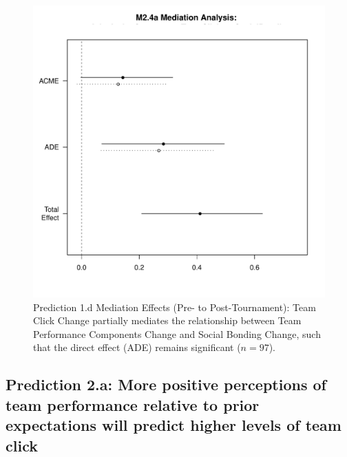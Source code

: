 \begin{CJK}{UTF8}{gbsn}
  \begin{figure}[htbp]
    \centering
    \includegraphics[scale=.5]{images/MLM24aMediationAnalysisOffline1.pdf}
    \caption{Prediction 1.d Mediation Effects (Pre- to Post-Tournament): Team Click Change partially mediates the relationship between Team Performance Components Change and Social Bonding Change, such that the direct effect (ADE) remains significant ($n = 97$).}
    \label{fig:MLM24aMediationAnalysis}
  \end{figure}





















\subsection{Prediction 2.a: More positive perceptions of team performance relative to prior expectations will predict higher levels of team click\label{sect:prediction1b}}


\end{CJK}
